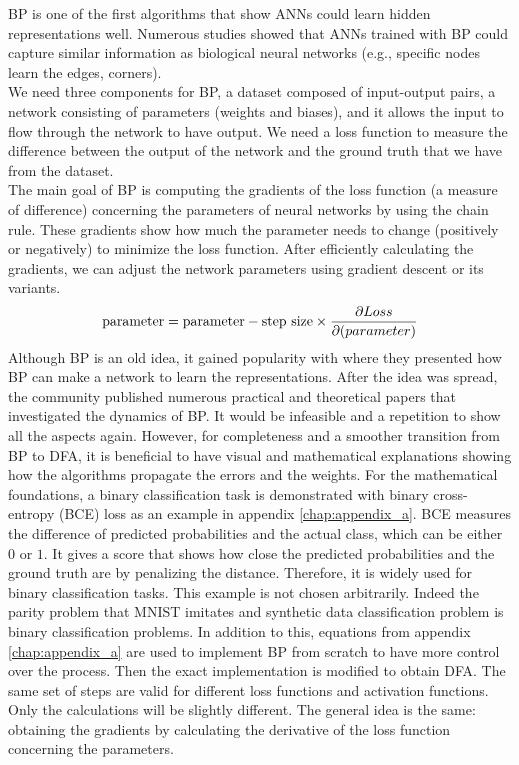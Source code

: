 \documentclass[a4paper, nobind]{templates/ociamthesis}
\begin{document}
BP is one of the first algorithms that show ANNs could learn hidden representations well. Numerous studies showed that ANNs trained with BP could capture similar information as biological neural networks (e.g., specific nodes learn the edges, corners).\\
We need three components for BP, a dataset composed of input-output pairs, a network consisting of parameters (weights and biases), and it allows the input to flow through the network to have output. We need a loss function to measure the difference between the output of the network and the ground truth that we have from the dataset.\\
The main goal of BP is computing the gradients of the loss function (a measure of difference) concerning the parameters of neural networks by using the chain rule. These gradients show how much the parameter needs to change (positively or negatively) to minimize the loss function. After efficiently calculating the gradients, we can adjust the network parameters using gradient descent or its variants.
\[
\begin{aligned} 
\text{parameter} &= \text{parameter} - \text{step size} \times \frac{\partial Loss}{\partial \text(parameter)}  \\
\end{aligned}
\]
\noindent Although BP is an old idea, it gained popularity with \cite{Rumelhart:1986we} where they presented how BP can make a network to learn the representations. After the idea was spread, the community published numerous practical and theoretical papers that investigated the dynamics of BP. It would be infeasible and a repetition to show all the aspects again. However, for completeness and a smoother transition from BP to DFA, it is beneficial to have visual and mathematical explanations showing how the algorithms propagate the errors and the weights. For the mathematical foundations, a binary classification task is demonstrated with binary cross-entropy (BCE) loss as an example in appendix \ref{chap:appendix_a}. BCE measures the difference of predicted probabilities and the actual class, which can be either \(0\) or \(1\). It gives a score that shows how close the predicted probabilities and the ground truth are by penalizing the distance. Therefore, it is widely used for binary classification tasks. This example is not chosen arbitrarily. Indeed the parity problem that MNIST imitates and synthetic data classification problem is binary classification problems. In addition to this, equations from appendix \ref{chap:appendix_a} are used to implement BP from scratch to have more control over the process. Then the exact implementation is modified to obtain DFA. The same set of steps are valid for different loss functions and activation functions. Only the calculations will be slightly different. The general idea is the same: obtaining the gradients by calculating the derivative of the loss function concerning the parameters.
\end{document}
